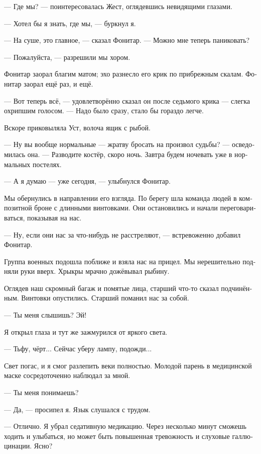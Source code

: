 \documentclass[a4paper,12pt,fleqn]{book}\usepackage{polyglossia}\setdefaultlanguage[babelshorthands=true]{russian}\setotherlanguage{english}\defaultfontfeatures{Ligatures=TeX,Mapping=tex-text}
\newcommand{\asterism}{\vspace{1em}{\centering\Large\bfseries$\ast~\ast~\ast$\par}\vspace{1em}}
\begin{document}
--- Где мы? --- поинтересовалась Жест, оглядевшись невидящими глазами.

--- Хотел бы я знать, где мы, --- буркнул я.

--- На суше, это главное, --- сказал Фонитар.
--- Можно мне теперь паниковать?

--- Пожалуйста, --- разрешили мы хором.

Фонитар заорал благим матом;
эхо разнесло его крик по прибрежным скалам.
Фонитар заорал ещё раз, и ещё.

--- Вот теперь всё, --- удовлетворённо сказал он после седьмого крика --- слегка охрипшим голосом.
--- Надо было сразу, стало бы гораздо легче.

Вскоре приковыляла Уст, волоча ящик с рыбой.

--- Ну вы вообще нормальные --- жратву бросать на произвол судьбы? --- осведомилась она.
--- Разводите костёр, скоро ночь.
Завтра будем ночевать уже в нормальных постелях.

--- А я думаю --- уже сегодня, --- улыбнулся Фонитар.

Мы обернулись в направлении его взгляда.
По берегу шла команда людей в композитной броне с длинными винтовками.
Они остановились и начали переговариваться, показывая на нас.

--- Ну, если они нас за что-нибудь не расстреляют, --- встревоженно добавил Фонитар.

Группа военных подошла поближе и взяла нас на прицел.
Мы нерешительно подняли руки вверх.
Хрыкры мрачно дожёвывал рыбину.

Оглядев наш скромный багаж и помятые лица, старший что-то сказал подчинённым.
Винтовки опустились.
Старший поманил нас за собой.

\asterism

--- Ты меня слышишь?
Эй!

Я открыл глаза и тут же зажмурился от яркого света.

--- Тьфу, чёрт...
Сейчас уберу лампу, подожди...

Свет погас, и я смог разлепить веки полностью.
Молодой парень в медицинской маске сосредоточенно наблюдал за мной.

--- Ты меня понимаешь?

--- Да, --- просипел я.
Язык слушался с трудом.

--- Отлично.
Я убрал седативную медикацию.
Через несколько минут сможешь ходить и улыбаться, но может быть повышенная тревожность и слуховые галлюцинации.
Ясно?
\end{document}
